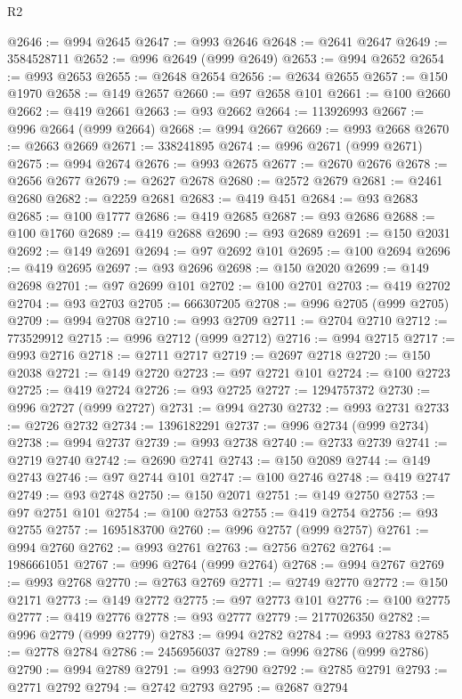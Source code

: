 \begin{lexlean}{R2}
\begin{coremodule}
@2646 := @994 @2645
@2647 := @993 @2646
@2648 := @2641 @2647
@2649 := 3584528711
@2652 := @996 @2649 (@999 @2649)
@2653 := @994 @2652
@2654 := @993 @2653
@2655 := @2648 @2654
@2656 := @2634 @2655
@2657 := @150 @1970
@2658 := @149 @2657
@2660 := @97 @2658 @101
@2661 := @100 @2660
@2662 := @419 @2661
@2663 := @93 @2662
@2664 := 113926993
@2667 := @996 @2664 (@999 @2664)
@2668 := @994 @2667
@2669 := @993 @2668
@2670 := @2663 @2669
@2671 := 338241895
@2674 := @996 @2671 (@999 @2671)
@2675 := @994 @2674
@2676 := @993 @2675
@2677 := @2670 @2676
@2678 := @2656 @2677
@2679 := @2627 @2678
@2680 := @2572 @2679
@2681 := @2461 @2680
@2682 := @2259 @2681
@2683 := @419 @451
@2684 := @93 @2683
@2685 := @100 @1777
@2686 := @419 @2685
@2687 := @93 @2686
@2688 := @100 @1760
@2689 := @419 @2688
@2690 := @93 @2689
@2691 := @150 @2031
@2692 := @149 @2691
@2694 := @97 @2692 @101
@2695 := @100 @2694
@2696 := @419 @2695
@2697 := @93 @2696
@2698 := @150 @2020
@2699 := @149 @2698
@2701 := @97 @2699 @101
@2702 := @100 @2701
@2703 := @419 @2702
@2704 := @93 @2703
@2705 := 666307205
@2708 := @996 @2705 (@999 @2705)
@2709 := @994 @2708
@2710 := @993 @2709
@2711 := @2704 @2710
@2712 := 773529912
@2715 := @996 @2712 (@999 @2712)
@2716 := @994 @2715
@2717 := @993 @2716
@2718 := @2711 @2717
@2719 := @2697 @2718
@2720 := @150 @2038
@2721 := @149 @2720
@2723 := @97 @2721 @101
@2724 := @100 @2723
@2725 := @419 @2724
@2726 := @93 @2725
@2727 := 1294757372
@2730 := @996 @2727 (@999 @2727)
@2731 := @994 @2730
@2732 := @993 @2731
@2733 := @2726 @2732
@2734 := 1396182291
@2737 := @996 @2734 (@999 @2734)
@2738 := @994 @2737
@2739 := @993 @2738
@2740 := @2733 @2739
@2741 := @2719 @2740
@2742 := @2690 @2741
@2743 := @150 @2089
@2744 := @149 @2743
@2746 := @97 @2744 @101
@2747 := @100 @2746
@2748 := @419 @2747
@2749 := @93 @2748
@2750 := @150 @2071
@2751 := @149 @2750
@2753 := @97 @2751 @101
@2754 := @100 @2753
@2755 := @419 @2754
@2756 := @93 @2755
@2757 := 1695183700
@2760 := @996 @2757 (@999 @2757)
@2761 := @994 @2760
@2762 := @993 @2761
@2763 := @2756 @2762
@2764 := 1986661051
@2767 := @996 @2764 (@999 @2764)
@2768 := @994 @2767
@2769 := @993 @2768
@2770 := @2763 @2769
@2771 := @2749 @2770
@2772 := @150 @2171
@2773 := @149 @2772
@2775 := @97 @2773 @101
@2776 := @100 @2775
@2777 := @419 @2776
@2778 := @93 @2777
@2779 := 2177026350
@2782 := @996 @2779 (@999 @2779)
@2783 := @994 @2782
@2784 := @993 @2783
@2785 := @2778 @2784
@2786 := 2456956037
@2789 := @996 @2786 (@999 @2786)
@2790 := @994 @2789
@2791 := @993 @2790
@2792 := @2785 @2791
@2793 := @2771 @2792
@2794 := @2742 @2793
@2795 := @2687 @2794

\end{coremodule}
\end{lexlean}
